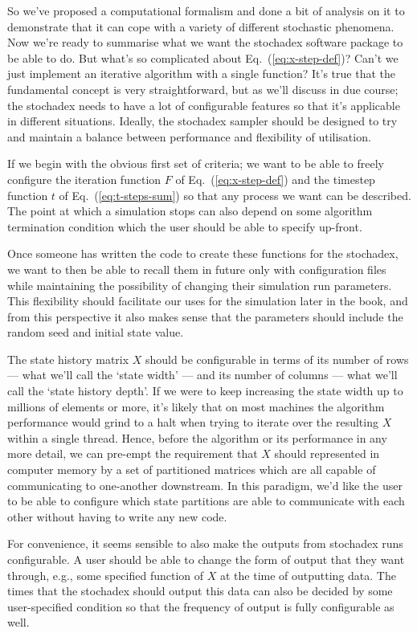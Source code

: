 \documentclass{book}
\begin{document}
So we've proposed a computational formalism and done a bit of analysis on it to demonstrate that it can cope with a variety of different stochastic phenomena. Now we're ready to summarise what we want the stochadex software package to be able to do. But what's so complicated about Eq.~(\ref{eq:x-step-def})? Can't we just implement an iterative algorithm with a single function? It's true that the fundamental concept is very straightforward, but as we'll discuss in due course; the stochadex needs to have a lot of configurable features so that it's applicable in different situations. Ideally, the stochadex sampler should be designed to try and maintain a balance between performance and flexibility of utilisation.

If we begin with the obvious first set of criteria; we want to be able to freely configure the iteration function $F$ of Eq.~(\ref{eq:x-step-def}) and the timestep function $t$ of Eq.~(\ref{eq:t-steps-sum}) so that any process we want can be described. The point at which a simulation stops can also depend on some algorithm termination condition which the user should be able to specify up-front.

Once someone has written the code to create these functions for the stochadex, we want to then be able to recall them in future only with configuration files while maintaining the possibility of changing their simulation run parameters. This flexibility should facilitate our uses for the simulation later in the book, and from this perspective it also makes sense that the parameters should include the random seed and initial state value.

The state history matrix $X$ should be configurable in terms of its number of rows --- what we'll call the `state width' --- and its number of columns --- what we'll call the `state history depth'. If we were to keep increasing the state width up to millions of elements or more, it's likely that on most machines the algorithm performance would grind to a halt when trying to iterate over the resulting $X$ within a single thread. Hence, before the algorithm or its performance in any more detail, we can pre-empt the requirement that $X$ should represented in computer memory by a set of partitioned matrices which are all capable of communicating to one-another downstream. In this paradigm, we'd like the user to be able to configure which state partitions are able to communicate with each other without having to write any new code.

For convenience, it seems sensible to also make the outputs from stochadex runs configurable. A user should be able to change the form of output that they want through, e.g., some specified function of $X$ at the time of outputting data. The times that the stochadex should output this data can also be decided by some user-specified condition so that the frequency of output is fully configurable as well. 
\end{document}
